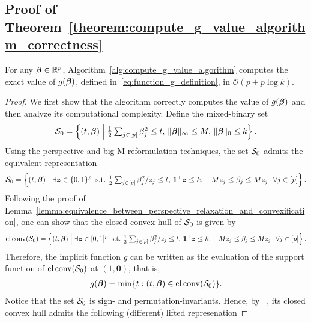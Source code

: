 \subsection{Proof of Theorem~\ref{theorem:compute_g_value_algorithm_correctness}}

\begin{namedtheorem}
    [~\ref{theorem:compute_g_value_algorithm_correctness}]
        For any $\bm{\beta} \in \mathbb{R}^p$, Algorithm~\ref{alg:compute_g_value_algorithm} computes the exact value of $g(\bm{\beta})$, defined in~\eqref{eq:function_g_definition}, in $\mathcal O(p + p \log k)$.
\end{namedtheorem}

\begin{proof}

We first show that the algorithm correctly computes the value of $g(\bm{\beta})$ and then analyze its computational complexity. Define the mixed-binary set
\begin{align*}
    \mathcal{S}_0 = \left\{ (t, \bm{\beta}) \;\middle|\; \textstyle \frac{1}{2} \sum_{j \in [p]} \beta_j^2 \leq t, \, \|\bm{\beta} \|_\infty \leq M, \, \|\bm{\beta} \|_0 \leq k \right\}.
\end{align*}
Using the perspective and big-M reformulation techniques, the set $\mathcal{S}_0$ admits the equivalent representation
\begin{align*}
    \mathcal{S}_0 = \left\{ (t, \bm{\beta}) \;\middle|\; \exists \bm{z} \in \{0,1\}^p ~ \operatorname{s.\!t.\!} ~ \textstyle \frac{1}{2} \sum_{j \in [p]} \beta_j^2 / z_j \leq t, \, \bm 1^\top \bm{z} \leq k, \, -M z_j \leq \beta_j \leq M z_j ~~ \forall j \in [p] \right\}.
\end{align*}
Following the proof of Lemma~\ref{lemma:equivalence_between_perspective_relaxation_and_convexification}, one can show that the closed convex hull of $\mathcal{S}_0$ is given by 
\begin{align*}
    \operatorname{cl} \operatorname{conv}(\mathcal{S}_0) = \left\{ (t, \bm{\beta}) \;\middle|\; \exists \bm{z} \in [0,1]^p ~ \operatorname{s.\!t.\!} ~ \textstyle \frac{1}{2} \sum_{j \in [p]} \beta_j^2 / z_j \leq t, \, \bm 1^\top \bm{z} \leq k, \, -M z_j \leq \beta_j \leq M z_j ~~ \forall j \in [p] \right\}.
\end{align*}
Therefore, the implicit function $g$ can be written as the evaluation of the support function of $\operatorname{cl}\operatorname{conv}(\mathcal{S}_0)$ at $(1, \bm 0)$, that is,
\begin{align}
    \label{eq:g:S0}
    g(\bm{\beta}) = \min  \{ t : (t, \bm{\beta}) \in \operatorname{cl}\operatorname{conv}(\mathcal{S}_0) \}.
\end{align}
Notice that the set $\mathcal{S}_0$ is sign- and permutation-invariants. Hence, by ~\citep[Theorem~4]{kim2022convexification}, its closed convex hull admits the following (different) lifted represenation

\end{proof}

